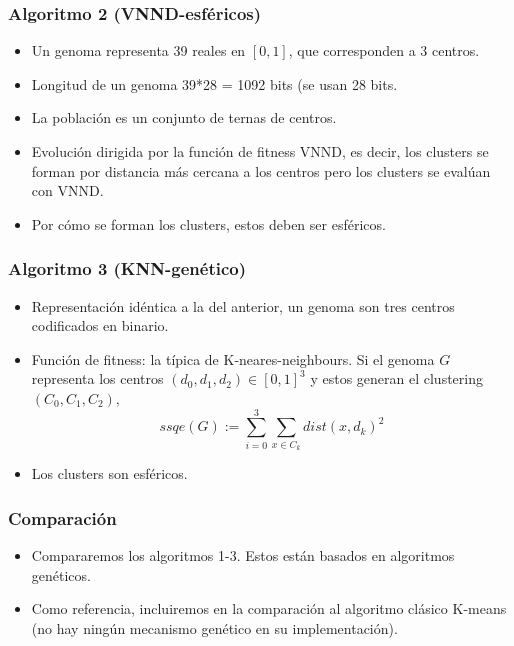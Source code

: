 \documentclass[11pt]{beamer}
\begin{document}
\begin{frame}[fragile]
    \frametitle{Algoritmo 2 (VNND-esféricos)}
        \begin{itemize}
            \item Un genoma representa 39 reales en $[0,1]$, que corresponden a 3 centros. 
            \item Longitud de un genoma 39*28 = 1092 bits (se usan 28 bits. 
                \item La población es un conjunto de ternas de centros. 
                \item Evolución dirigida por la función de fitness VNND, es decir, los clusters se forman por distancia
                    más cercana a los centros pero los clusters se evalúan con VNND. 
                \item Por cómo se forman los clusters, estos deben ser esféricos.
        \end{itemize}

\end{frame}


\begin{frame}[fragile]
    \frametitle{Algoritmo 3 (KNN-genético)}
        \begin{itemize}
            \item Representación idéntica a la del anterior, un genoma son tres centros codificados en binario. 
            \item Función de fitness: la típica de K-neares-neighbours. Si el genoma $G$ representa los centros $(d_0,
                d_1,d_2)\in [0,1]^3$ y estos generan el clustering $(C_0,C_1,C_2)$, 
                \[ ssqe(G) := \sum _{i = 0}^3 \sum_{x\in C_k} dist(x,d_k)^2\]
            \item  Los clusters son esféricos.
        \end{itemize}

\end{frame}
\begin{frame}[fragile]
    \frametitle{Comparación}
        \begin{itemize}
            \item Compararemos los algoritmos 1-3. Estos están basados en algoritmos genéticos.
            \item Como referencia, incluiremos en la comparación al algoritmo clásico K-means (no hay ningún mecanismo
                    genético en su implementación). 
        \end{itemize}

\end{frame}
\end{document}
